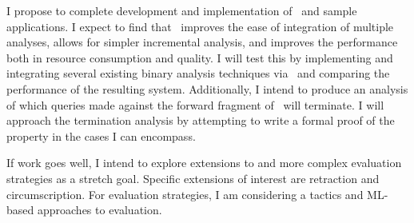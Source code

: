 I propose to complete development and implementation of \sysname\ and sample applications.
I expect to find that \sysname\ improves the ease of integration of multiple analyses, allows for simpler incremental analysis, and improves the performance both in resource consumption and quality.
I will test this by implementing and integrating several existing binary analysis techniques via \sysname\ and comparing the performance of the resulting system.
Additionally, I intend to produce an analysis of which queries made against the forward fragment of \sysname\ will terminate.
I will approach the termination analysis by attempting to write a formal proof of the property in the cases I can encompass.

If work goes well, I intend to explore extensions to \sysname and more complex evaluation strategies as a stretch goal.
Specific extensions of interest are retraction and circumscription.
For evaluation strategies, I am considering a tactics and ML-based approaches to evaluation.
